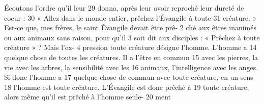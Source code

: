 Écoutons l'ordre qu'il leur	 
29	 	donna, après leur avoir reproché leur dureté de coeur :	 
30	 	« Allez dans le monde entier, prêchez l'Évangile à toute	 
31	 	créature. »
Est-ce que, mes frères, le saint Évangile devait être prê-	 
2	 	ché aux êtres inanimés ou aux animaux sans raison, pour qu'il	 
3	 	soit dit aux disciples : « Prêchez à toute créature » ? Mais l'ex-	 
4	 	pression toute créature désigne l'homme.
L'homme a	 
14	 	quelque chose de toutes les créatures. Il a l'être en commun	 
15	 	avec les pierres, la vie avec les arbres, la sensibilité avec les	 
16	 	animaux, l'intelligence avec les anges. Si donc l'homme a	 
17	 	quelque chose de commun avec toute créature, en un sens	 
18	 	l'homme est toute créature. L'Évangile est donc prêché à	 
19	 	toute créature, alors même qu'il est prêché à l'homme seule-	 
20	 	ment